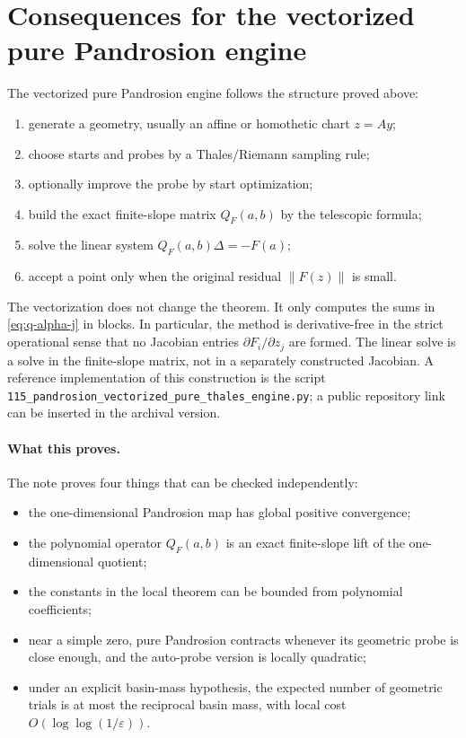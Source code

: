 \documentclass[11pt]{article}
\theoremstyle{definition}
\theoremstyle{remark}
\newcommand{\norm}[1]{\left\lVert #1\right\rVert}
\begin{document}
\section{Consequences for the vectorized pure Pandrosion engine}

The vectorized pure Pandrosion engine follows the structure proved above:
\begin{enumerate}
\item generate a geometry, usually an affine or homothetic chart $z=Ay$;
\item choose starts and probes by a Thales/Riemann sampling rule;
\item optionally improve the probe by start optimization;
\item build the exact finite-slope matrix $Q_F(a,b)$ by the telescopic formula;
\item solve the linear system $Q_F(a,b)\Delta=-F(a)$;
\item accept a point only when the original residual $\norm{F(z)}$ is small.
\end{enumerate}
The vectorization does not change the theorem.  It only computes the sums in \eqref{eq:q-alpha-j} in blocks.  In particular, the method is derivative-free in the strict operational sense that no Jacobian entries $\partial F_i/\partial z_j$ are formed.  The linear solve is a solve in the finite-slope matrix, not in a separately constructed Jacobian.  A reference implementation of this construction is the script \texttt{115\_pandrosion\_vectorized\_pure\_thales\_engine.py}; a public repository link can be inserted in the archival version.

\paragraph{What this proves.}
The note proves four things that can be checked independently:
\begin{itemize}
\item the one-dimensional Pandrosion map has global positive convergence;
\item the polynomial operator $Q_F(a,b)$ is an exact finite-slope lift of the one-dimensional quotient;
\item the constants in the local theorem can be bounded from polynomial coefficients;
\item near a simple zero, pure Pandrosion contracts whenever its geometric probe is close enough, and the auto-probe version is locally quadratic;
\item under an explicit basin-mass hypothesis, the expected number of geometric trials is at most the reciprocal basin mass, with local cost $O(\log\log(1/\varepsilon))$.
\end{itemize}
\end{document}
